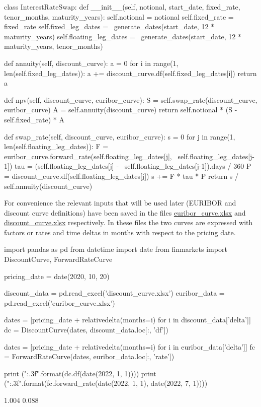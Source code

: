 \begin{ipython}
class InterestRateSwap:
    def __init__(self, notional, start_date, fixed_rate,
                 tenor_months, maturity_years):
        self.notional = notional
        self.fixed_rate = fixed_rate
        self.fixed_leg_dates = \
            generate_dates(start_date, 12 * maturity_years)
        self.floating_leg_dates = \
            generate_dates(start_date, 12 * maturity_years, tenor_months)
    
    def annuity(self, discount_curve):
        a = 0
        for i in range(1, len(self.fixed_leg_dates)):
            a += discount_curve.df(self.fixed_leg_dates[i])
        return a

    def npv(self, discount_curve, euribor_curve):
        S = self.swap_rate(discount_curve, euribor_curve)
        A = self.annuity(discount_curve)
        return self.notional * (S - self.fixed_rate) * A

    def swap_rate(self, discount_curve, euribor_curve):
        s = 0
        for j in range(1, len(self.floating_leg_dates)):
            F = euribor_curve.forward_rate(self.floating_leg_dates[j], \ 
                                           self.floating_leg_dates[j-1])
            tau = (self.floating_leg_dates[j] - \
                   self.floating_leg_dates[j-1]).days / 360 
            P = discount_curve.df(self.floating_leg_dates[j])
            s += F * tau * P
        return s / self.annuity(discount_curve)
\end{ipython}

For convenience the relevant inputs that will be used later (EURIBOR and discount curve definitions) have been saved in the files  \href{https://github.com/matteosan1/finance_course/blob/develop/libro/input_files/euribor_curve.xlsx?raw=true}{euribor\_curve.xlsx} and \href{https://github.com/matteosan1/finance_course/raw/develop/libro/input_files/discount_curve.xlsx}{discount\_curve.xlsx} respectively.
In these files the two curves are expressed with factors or rates and time deltas in months with respect to the pricing date.

\begin{ipython}
import pandas as pd
from datetime import date
from finmarkets import DiscountCurve, ForwardRateCurve

pricing_date = date(2020, 10, 20)

discount_data = pd.read_excel('discount_curve.xlsx')
euribor_data = pd.read_excel('euribor_curve.xlsx')

dates = [pricing_date + relativedelta(months=i) for i in discount_data['delta']]
dc = DiscountCurve(dates, discount_data.loc[:, 'df'])

dates = [pricing_date + relativedelta(months=i) for i in euribor_data['delta']]                   
fc = ForwardRateCurve(dates,
                      euribor_data.loc[:, 'rate'])

print ("{:.3f}".format(dc.df(date(2022, 1, 1))))
print ("{:.3f}".format(fc.forward_rate(date(2022, 1, 1), date(2022, 7, 1))))
\end{ipython}
\begin{ioutput}
1.004
0.088
\end{ioutput}

